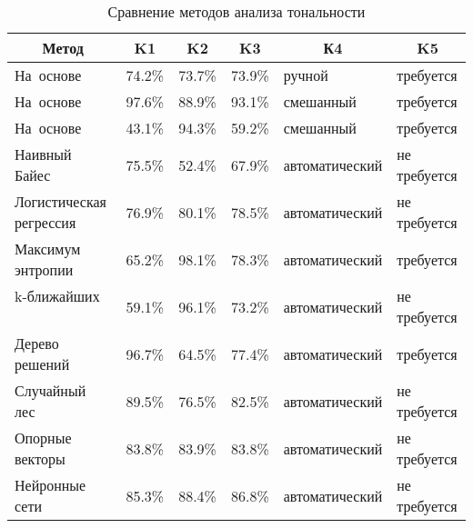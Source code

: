 \clearpage
\noindent
\captionsetup{format=hang,justification=raggedright,
              singlelinecheck=off,width=16.8cm}
\begin{longtable}[Hc]{|p{3.2cm}|p{1.5cm}|p{1.5cm}|p{1.5cm}|p{3.5cm}|p{3cm}|}
\caption{Сравнение методов анализа тональности\label{tab:02}}\\
    \hline
    \multicolumn{1}{|c}{\textbf{Метод}} & \multicolumn{1}{|c|}{\textbf{K1}} &
    \multicolumn{1}{c|}{\textbf{K2}} & \multicolumn{1}{c}{\textbf{K3}} &
    \multicolumn{1}{|c|}{\textbf{К4}} & \multicolumn{1}{c|}{\textbf{K5}}\\
    \hline
    \mbox{На~основе}
    ~\cite{article10}    & 74.2\% & 73.7\% & 73.9\%
                                     & ручной & требуется \\*
    \hline
    \mbox{На~основе}
    ~\cite{article22}  & 97.6\% & 88.9\% & 93.1\%
                                     & смешанный & требуется\\*
    \hline
    \mbox{На~основе}
    ~\cite{article23}  & 43.1\% & 94.3\% & 59.2\%
                                     & смешанный & требуется\\*
    \hline
    Наивный\linebreak
    Байес~\cite{article21}               & 75.5\% & 52.4\% & 67.9\%
                                     & автоматический & не требуется\\*
    \hline
    Логистическая
    регрессия ~\cite{article21}          & 76.9\% & 80.1\% & 78.5\%
                                     & автоматический & не требуется\\
    \hline
    Максимум\linebreak
    энтропии~\cite{article19}            & 65.2\% & 98.1\% & 78.3\%
                                     & автоматический & требуется\\
    \hline
    k-ближайших
    ~\cite{article21}   & 59.1\% & 96.1\% & 73.2\%
                                     & автоматический & не требуется\\
    \hline
    Дерево\linebreak
    решений~\cite{article21}             & 96.7\% & 64.5\% & 77.4\%
                                     & автоматический & требуется\\
    \hline
    Случайный лес~\cite{article21}       & 89.5\% & 76.5\% & 82.5\%
                                     & автоматический & не требуется\\
    \hline
    Опорные\linebreak
    векторы~\cite{article19}             & 83.8\% & 83.9\% & 83.8\%
                                     & автоматический & не требуется\\
    \hline
    Нейронные\linebreak
    сети~\cite{article21}                & 85.3\% & 88.4\% & 86.8\%
                                     & автоматический & не требуется \\
    \hline
\end{longtable}

